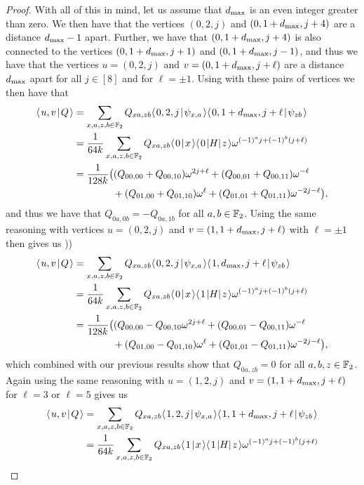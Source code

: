 \documentclass[../thesis-main/thesis-main]{subfiles}
\begin{document}
\begin{proof}
With all of this in mind, let us assume that $d_{\text{max}}$ is an even integer greater than zero.  We then have that the vertices $(0,2,j)$ and $(0,1+d_{\text{max}},j+4)$ are a distance $d_{\text{max}}-1$ apart.  Further, we have that $(0,1+d_{\text{max}},j+4)$ is also connected to the vertices $(0,1+d_{\text{max}},j+1)$ and $(0,1+d_{\text{max}},j-1)$, and thus we have that the vertices $u = (0,2,j)$ and $v = (0,1+d_{\text{max}}, j + \ell)$ are a distance $d_{\text{max}}$ apart for all $j\in [8]$ and for $\ell = \pm 1$.  Using  with these pairs of vertices we then have that 
\begin{align}
  \langle\mspace{2mu} u,v \mspace{2mu} | \mspace{2mu} Q\mspace{2mu} \rangle &= \sum_{x,a,z,b\in \mathbb{F}_2} Q_{xa,zb} \langle\mspace{2mu} 0,2,j \mspace{2mu} | \mspace{2mu} \psi_{x,a}\mspace{2mu} \rangle\langle\mspace{2mu} 0,1+d_{\text{max}},j+\ell \mspace{2mu} | \mspace{2mu} \psi_{zb}\mspace{2mu} \rangle\\
  &=\frac{1}{64 k} \sum_{x,a,z,b\in \mathbb{F}_2} Q_{xa,zb} \langle\mspace{2mu} 0 \mspace{2mu} | \mspace{2mu} x\mspace{2mu} \rangle \langle\mspace{2mu} 0 \mspace{2mu} | H |\mspace{2mu} z \mspace{2mu} \rangle \omega^{(-1)^a j+ (-1)^b (j+\ell)}\\
  &= \frac{1}{128 k} \big( (Q_{00,00} + Q_{00,10}) \omega^{2j + \ell} + (Q_{00,01} + Q_{00,11})\omega^{-\ell} \nonumber\\
  &\qquad \qquad + (Q_{01,00} + Q_{01,10})\omega^{\ell} + (Q_{01,01} + Q_{01,11})\omega^{-2j - \ell}\big),
\end{align}
and thus we have that $Q_{0a,0b} = - Q_{0a,1b}$ for all $a,b\in \mathbb{F}_2$.  Using the same reasoning with vertices $u =(0,2,j)$ and $v =(1,1+d_{\text{max}}, j+\ell)$ with $\ell =\pm 1$ then gives us ))
\begin{align}
  \langle\mspace{2mu} u,v \mspace{2mu} | \mspace{2mu} Q\mspace{2mu} \rangle &= \sum_{x,a,z,b\in \mathbb{F}_2} Q_{xa,zb} \langle\mspace{2mu} 0,2,j \mspace{2mu} | \mspace{2mu} \psi_{x,a}\mspace{2mu} \rangle\langle\mspace{2mu} 1,d_{\text{max}},j+\ell \mspace{2mu} | \mspace{2mu} \psi_{zb}\mspace{2mu} \rangle\\
  &=\frac{1}{64 k} \sum_{x,a,z,b\in \mathbb{F}_2} Q_{xa,zb} \langle\mspace{2mu} 0 \mspace{2mu} | \mspace{2mu} x\mspace{2mu} \rangle \langle\mspace{2mu} 1 \mspace{2mu} | H |\mspace{2mu} z \mspace{2mu} \rangle \omega^{(-1)^a j+ (-1)^b (j+\ell)}\\
  &= \frac{1}{128 k} \big( (Q_{00,00} - Q_{00,10} \omega^{2j + \ell} + (Q_{00,01} - Q_{00,11})\omega^{-\ell} \nonumber\\
  &\qquad \qquad + (Q_{01,00} - Q_{01,10})\omega^{\ell} + (Q_{01,01} - Q_{01,11})\omega^{-2j - \ell}\big),
\end{align}
which combined with our previous results show that $Q_{0a,zb} = 0$ for all $a,b,z\in \mathbb{F}_2$.  Again using the same reasoning with $u = (1,2,j)$ and $v= (1,1+d_{\text{max}}, j+\ell)$ for $\ell =3$ or $\ell = 5$ gives us 
\begin{align}
  \braket{u,v}{Q} &= \sum_{x,a,z,b\in \FF_2} Q_{xa,zb} \braket{1,2,j}{\psi_{x,a}}\braket{1,1+\dmax,j+\ell}{\psi_{zb}}\\
  &=\frac{1}{64 k} \sum_{x,a,z,b\in \FF_2} Q_{xa,zb} \braket{1}{x} \bra{1} H \ket{z} \omega^{(-1)^a j+ (-1)^b (j+\ell)}\\

\end{align}
\end{proof}
\end{document}
